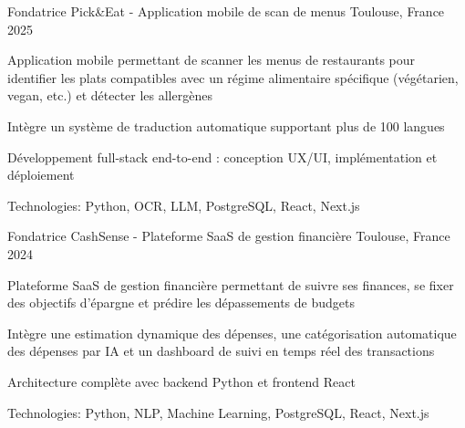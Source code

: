 


\begin{cventries}


\cventry
{Fondatrice} %
{Pick\&Eat - Application mobile de scan de menus} %
{Toulouse, France} %
{2025} %
{ %
\begin{cvitems}
\item {Application mobile permettant de scanner les menus de restaurants pour identifier les plats compatibles avec un régime alimentaire spécifique (végétarien, vegan, etc.) et détecter les allergènes}
\item {Intègre un système de traduction automatique supportant plus de 100 langues}
\item {Développement full-stack end-to-end : conception UX/UI, implémentation et déploiement}
\item {Technologies: Python, OCR, LLM, PostgreSQL, React, Next.js}
\end{cvitems}
}
\vspace{1.5em}


\cventry
{Fondatrice} %
{CashSense - Plateforme SaaS de gestion financière} %
{Toulouse, France} %
{2024} %
{ %
\begin{cvitems}
\item {Plateforme SaaS de gestion financière permettant de suivre ses finances, se fixer des objectifs d'épargne et prédire les dépassements de budgets}
\item {Intègre une estimation dynamique des dépenses, une catégorisation automatique des dépenses par IA et un dashboard de suivi en temps réel des transactions}
\item {Architecture complète avec backend Python et frontend React}
\item {Technologies: Python, NLP, Machine Learning, PostgreSQL, React, Next.js}
\end{cvitems}
}
\vspace{1.5em}


\end{cventries}
